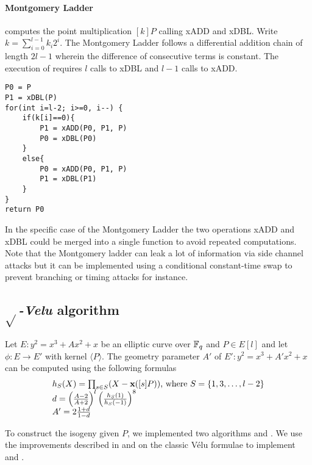 \documentclass[../main.tex]{subfilesubs}
\begin{document}
\paragraph{Montgomery Ladder}  computes the point multiplication $[k]P$ calling xADD and xDBL. Write $k=\sum_{i=0}^{l-1}k_i2^i$. The Montgomery Ladder follows a differential addition chain of length $2l-1$ wherein the difference of consecutive terms is constant. The execution of  requires $l$ calls to xDBL and $l-1$ calls to xADD.
\begin{verbatim}
P0 = P
P1 = xDBL(P)
for(int i=l-2; i>=0, i--) {
	if(k[i]==0){
		P1 = xADD(P0, P1, P)
		P0 = xDBL(P0)
	}
	else{
		P0 = xADD(P0, P1, P)
		P1 = xDBL(P1)
	}
}
return P0
\end{verbatim}
In the specific case of the Montgomery Ladder the two operations xADD and xDBL could be merged into a single function to avoid repeated computations.
Note that the Montgomery ladder can leak a lot of information via side channel attacks but it can be implemented using a conditional constant-time swap to prevent branching or timing attacks for instance.

\subsection{$\sqrt{}$\textit{-Velu} algorithm}

\begin{lemma}
	Let $E:y^2=x^3+Ax^2+x$ be an elliptic curve over $\mathbb{F}_q$ and $P\in E[l]$ and let $\phi:E\rightarrow E'$ with kernel $\langle P \rangle$.
	The geometry parameter $A'$ of $E' : y^2=x^3+A'x^2+x$ can be computed using the following formulas
	\begin{equation}\label{veluform}\begin{array}{l}
			h_S(X) = \prod_{s\in S}(X-\textbf{x}([s]P))\text{, where }S=\{1,3, \ldots, l-2\} \\
			d = \left(\frac{A-2}{A+2}\right)^l \left( \frac{h_S(1)}{h_S(-1)}\right)^8\\
			A'=2\frac{1+d}{1-d}
		\end{array}\end{equation}

\end{lemma}
To construct the isogeny given $P$, we implemented two algorithms  and . We use the improvements described in \cite{} and \cite{} on the classic Vélu formulae to implement  and .
\end{document}
